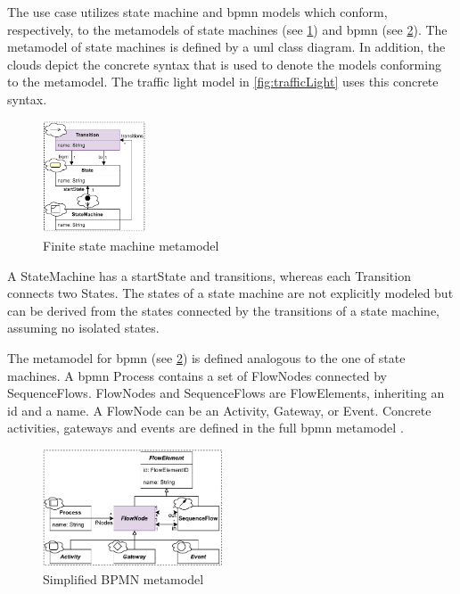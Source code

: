 \documentclass{jot}
\begin{document}
The use case utilizes state machine and \gls*{bpmn} models which conform, respectively, to the metamodels of state machines (see \cref{fig:fsm_metamodel}) and \gls*{bpmn} (see \cref{fig:bpmn_metamodel}).
The metamodel of state machines is defined by a \gls*{uml} class diagram.
In addition, the clouds depict the concrete syntax that is used to denote the models conforming to the metamodel.
The traffic light model in \cref{fig:trafficLight} uses this concrete syntax.

\begin{figure}[h]
    \centering
    \includegraphics[width=0.275\textwidth]{figures/state_machine_metamodel.pdf}
    \caption{Finite state machine metamodel}
    \label{fig:fsm_metamodel}
\end{figure}

A \textsf{StateMachine} has a \textsf{startState} and \textsf{transitions}, whereas each \textsf{Transition} connects two \textsf{State}s.
The states of a state machine are not explicitly modeled but can be derived from the states connected by the transitions of a state machine, assuming no isolated states.

The metamodel for \gls*{bpmn} (see \cref{fig:bpmn_metamodel}) is defined analogous to the one of state machines. 
A \gls*{bpmn} \textsf{Process} contains a set of \textsf{FlowNode}s connected by \textsf{SequenceFlow}s.
\textsf{FlowNode}s and \textsf{SequenceFlow}s are \textsf{FlowElement}s, inheriting an \textsf{id} and a \textsf{name}.
A \textsf{FlowNode} can be an \textsf{Activity}, \textsf{Gateway}, or \textsf{Event}.
Concrete activities, gateways and events are defined in the full \gls*{bpmn} metamodel \cite{objectmanagementgroupBusinessProcessModel2013}. %

\begin{figure}[h]
    \centering
    \includegraphics[width=0.475\textwidth]{figures/bpmn_metamodel.pdf}
    \caption{Simplified BPMN metamodel \cite{objectmanagementgroupBusinessProcessModel2013}}
    \label{fig:bpmn_metamodel}
\end{figure}
\end{document}
